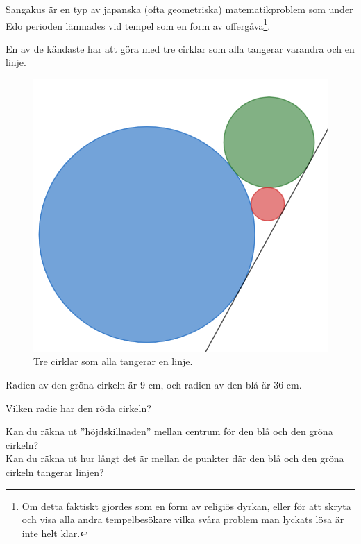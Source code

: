 
Sangakus är en typ av japanska (ofta geometriska) matematikproblem som under Edo perioden lämnades vid tempel som en form av offergåva\footnote{Om detta faktiskt gjordes som en form av religiös dyrkan, eller för att skryta och visa alla andra tempelbesökare vilka svåra problem man lyckats lösa är inte helt klar.}.

En av de kändaste har att göra med tre cirklar som alla tangerar varandra och en linje.
\begin{figure}[H]
    \centering
    \includegraphics[width=0.5\linewidth]{img/tre cirklar.png}
    \caption{Tre cirklar som alla tangerar en linje.}
\end{figure}


Radien av den gröna cirkeln är 9 cm, och radien av den blå är 36 cm.

Vilken radie har den röda cirkeln?

\begin{rem}
    Kan du räkna ut ''höjdskillnaden'' mellan centrum för den blå och den gröna cirkeln?\\
    Kan du räkna ut hur långt det är mellan de punkter där den blå och den gröna cirkeln tangerar linjen?
\end{rem}
